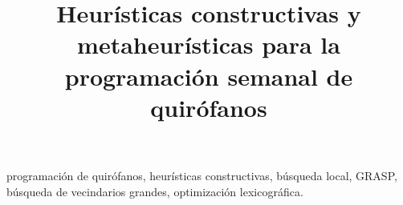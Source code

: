\documentclass[conference]{IEEEtran}
\begin{document}
\title{Heurísticas constructivas y metaheurísticas para la programación semanal de quirófanos}

\author{
}

\maketitle



\begin{IEEEkeywords}
programación de quirófanos, heurísticas constructivas, búsqueda local, GRASP, búsqueda de vecindarios grandes, optimización lexicográfica.
\end{IEEEkeywords}





\end{document}
